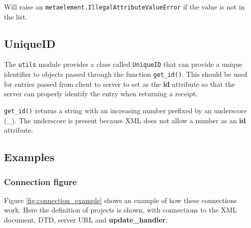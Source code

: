 Will raise an \texttt{metaelement.IllegalAttributeValueError} if the value is
not in the list.

\subsection{UniqueID}
The \texttt{utils} module provides a class called \texttt{UniqueID} that can
provide a unique identifier to objects passed through the function
\texttt{get\_id()}. This should be used for entries passed from client to
server to set as the \textbf{id} attribute so that the server can properly
identify the entry when returning a receipt. 

\texttt{get\_id()} returns a string with an increasing number prefixed by an
underscore (\_). The underscore is present because XML does not allow a number
as an \textbf{id} attribute. 

\subsection{Examples}

\subsubsection{Connection figure}
Figure \ref{fig:connection_example} shows an example of how these connections
work. Here the definition of projects is shown, with connections to the XML
document, DTD, server URL and \textbf{update\_handler}.

